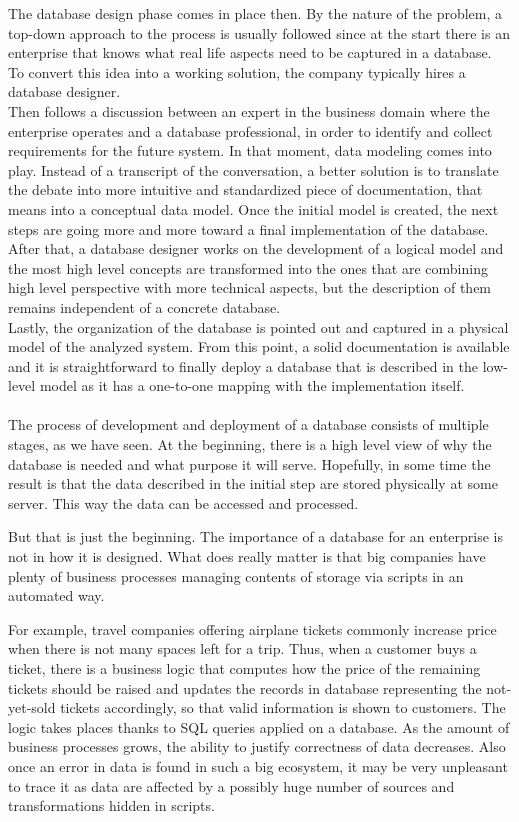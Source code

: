 The database design phase comes in place then. By the nature of the problem, a top-down approach to the process is usually followed since at the start there is an enterprise that knows what real life aspects need to be captured in a database. To convert this idea into a working solution, the company typically hires a database designer. \\

Then follows a discussion between an expert in the business domain where the enterprise operates and a database professional, in order to identify and collect requirements for the future system.
In that moment, data modeling comes into play. 
Instead of a transcript of the conversation, a better solution is to translate the debate into more intuitive and standardized piece of documentation, that means into a conceptual data model.
Once the initial model is created, the next steps are going more and more toward a final implementation of the database. After that, a database designer works on the development of a logical model and the most high level concepts are transformed into the ones that are combining high level perspective with more technical aspects, but the description of them remains independent of a concrete database. \\

Lastly, the organization of the database is pointed out and captured in a physical model of the analyzed system. From this point, a solid documentation is available and it is straightforward to finally deploy a database that is described in the low-level model as it has a one-to-one mapping with the implementation itself. \\ \\

The process of development and deployment of a database consists of multiple stages, as we have seen. At the beginning, there is a high level view of why the database is needed and what purpose it will serve. Hopefully, in some time the result is that the data described in the initial step are stored physically at some server. 
This way the data can be accessed and processed.

But that is just the beginning. The importance of a database for an enterprise is not in how it is designed. What does really matter is that big companies have plenty of business processes managing contents of storage via scripts in an automated way. 

For example, travel companies offering airplane tickets commonly increase price when there is not many spaces left for a trip. 
Thus, when a customer buys a ticket, there is a business logic that computes how the price of the remaining tickets should be raised and updates the records in database representing the not-yet-sold tickets accordingly, so that valid information is shown to customers.
The logic takes places thanks to SQL queries applied on a database.
As the amount of business processes grows, the ability to justify correctness of data decreases. 
Also once an error in data is found in such a big ecosystem, it may be very unpleasant to trace it as data are affected by a possibly huge number of sources and transformations hidden in scripts.


